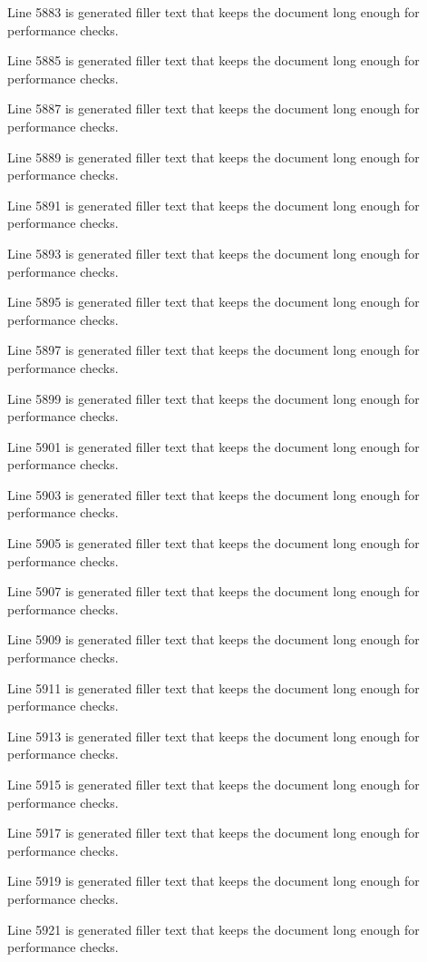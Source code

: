 Line 5883 is generated filler text that keeps the document long enough for performance checks.

Line 5885 is generated filler text that keeps the document long enough for performance checks.

Line 5887 is generated filler text that keeps the document long enough for performance checks.

Line 5889 is generated filler text that keeps the document long enough for performance checks.

Line 5891 is generated filler text that keeps the document long enough for performance checks.

Line 5893 is generated filler text that keeps the document long enough for performance checks.

Line 5895 is generated filler text that keeps the document long enough for performance checks.

Line 5897 is generated filler text that keeps the document long enough for performance checks.

Line 5899 is generated filler text that keeps the document long enough for performance checks.

Line 5901 is generated filler text that keeps the document long enough for performance checks.

Line 5903 is generated filler text that keeps the document long enough for performance checks.

Line 5905 is generated filler text that keeps the document long enough for performance checks.

Line 5907 is generated filler text that keeps the document long enough for performance checks.

Line 5909 is generated filler text that keeps the document long enough for performance checks.

Line 5911 is generated filler text that keeps the document long enough for performance checks.

Line 5913 is generated filler text that keeps the document long enough for performance checks.

Line 5915 is generated filler text that keeps the document long enough for performance checks.

Line 5917 is generated filler text that keeps the document long enough for performance checks.

Line 5919 is generated filler text that keeps the document long enough for performance checks.

Line 5921 is generated filler text that keeps the document long enough for performance checks.


